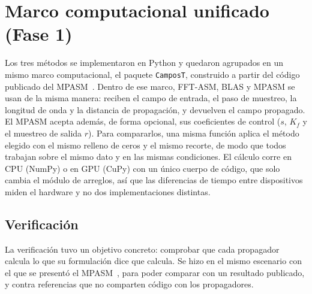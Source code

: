 \section{Marco computacional unificado (Fase 1)}
\label{sec:implementacion}

Los tres métodos se implementaron en Python y quedaron agrupados en un mismo
marco computacional, el paquete \texttt{CamposT}, construido a partir del
código publicado del MPASM~\cite{zhao2020code}. Dentro de ese marco, FFT-ASM,
BLAS y MPASM se usan de la misma manera: reciben el campo de entrada, el paso
de muestreo, la longitud de onda y la distancia de propagación, y devuelven el
campo propagado. El MPASM acepta además, de forma opcional, sus coeficientes
de control ($s$, $K_f$ y el muestreo de salida $r$). Para compararlos, una
misma función aplica el método elegido con el mismo relleno de ceros y el
mismo recorte, de modo que todos trabajan sobre el mismo dato y en las mismas
condiciones. El cálculo corre en CPU (NumPy) o en GPU (CuPy) con un
único cuerpo de código, que solo cambia el módulo de arreglos, así que las
diferencias de tiempo entre dispositivos miden el hardware y no dos
implementaciones distintas.

\subsection{Verificación}
\label{sec:verificacion}

La verificación tuvo un objetivo concreto: comprobar que cada propagador
calcula lo que su formulación dice que calcula. Se hizo en el mismo escenario
con el que se presentó el MPASM~\cite{zhao2020}, para poder comparar con un
resultado publicado, y contra referencias que no comparten código con los
propagadores.


